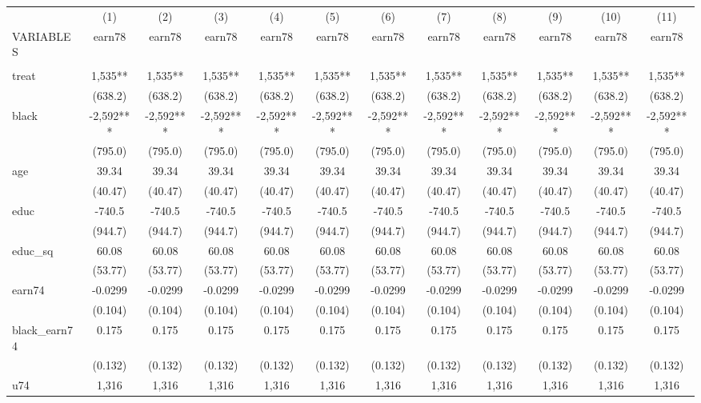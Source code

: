 \documentclass[]{article}
\begin{document}
\begin{tabular}{lccccccccccc} \hline
 & (1) & (2) & (3) & (4) & (5) & (6) & (7) & (8) & (9) & (10) & (11) \\
VARIABLES & earn78 & earn78 & earn78 & earn78 & earn78 & earn78 & earn78 & earn78 & earn78 & earn78 & earn78 \\ \hline
 &  &  &  &  &  &  &  &  &  &  &  \\
treat & 1,535** & 1,535** & 1,535** & 1,535** & 1,535** & 1,535** & 1,535** & 1,535** & 1,535** & 1,535** & 1,535** \\
 & (638.2) & (638.2) & (638.2) & (638.2) & (638.2) & (638.2) & (638.2) & (638.2) & (638.2) & (638.2) & (638.2) \\
black & -2,592*** & -2,592*** & -2,592*** & -2,592*** & -2,592*** & -2,592*** & -2,592*** & -2,592*** & -2,592*** & -2,592*** & -2,592*** \\
 & (795.0) & (795.0) & (795.0) & (795.0) & (795.0) & (795.0) & (795.0) & (795.0) & (795.0) & (795.0) & (795.0) \\
age & 39.34 & 39.34 & 39.34 & 39.34 & 39.34 & 39.34 & 39.34 & 39.34 & 39.34 & 39.34 & 39.34 \\
 & (40.47) & (40.47) & (40.47) & (40.47) & (40.47) & (40.47) & (40.47) & (40.47) & (40.47) & (40.47) & (40.47) \\
educ & -740.5 & -740.5 & -740.5 & -740.5 & -740.5 & -740.5 & -740.5 & -740.5 & -740.5 & -740.5 & -740.5 \\
 & (944.7) & (944.7) & (944.7) & (944.7) & (944.7) & (944.7) & (944.7) & (944.7) & (944.7) & (944.7) & (944.7) \\
educ\_sq & 60.08 & 60.08 & 60.08 & 60.08 & 60.08 & 60.08 & 60.08 & 60.08 & 60.08 & 60.08 & 60.08 \\
 & (53.77) & (53.77) & (53.77) & (53.77) & (53.77) & (53.77) & (53.77) & (53.77) & (53.77) & (53.77) & (53.77) \\
earn74 & -0.0299 & -0.0299 & -0.0299 & -0.0299 & -0.0299 & -0.0299 & -0.0299 & -0.0299 & -0.0299 & -0.0299 & -0.0299 \\
 & (0.104) & (0.104) & (0.104) & (0.104) & (0.104) & (0.104) & (0.104) & (0.104) & (0.104) & (0.104) & (0.104) \\
black\_earn74 & 0.175 & 0.175 & 0.175 & 0.175 & 0.175 & 0.175 & 0.175 & 0.175 & 0.175 & 0.175 & 0.175 \\
 & (0.132) & (0.132) & (0.132) & (0.132) & (0.132) & (0.132) & (0.132) & (0.132) & (0.132) & (0.132) & (0.132) \\
u74 & 1,316 & 1,316 & 1,316 & 1,316 & 1,316 & 1,316 & 1,316 & 1,316 & 1,316 & 1,316 & 1,316 \\

\end{tabular}
\end{document}
